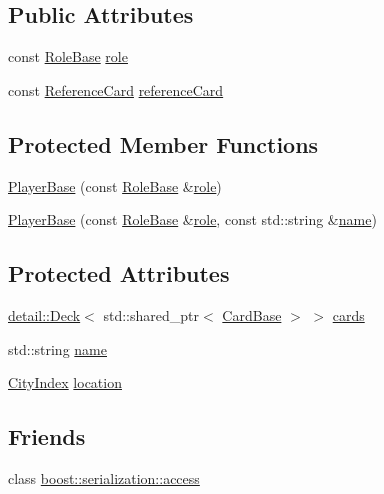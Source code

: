 \subsection*{Public Attributes}
\begin{DoxyCompactItemize}
\item 
const \hyperlink{classpan_1_1_role_base}{Role\+Base} \hyperlink{classpan_1_1_player_base_a63c1e92022a4eb34dc3a59d516ee6cea}{role}
\item 
const \hyperlink{classpan_1_1_reference_card}{Reference\+Card} \hyperlink{classpan_1_1_player_base_ae222fd3f8e044135bcc5d52fdd786804}{reference\+Card}
\end{DoxyCompactItemize}
\subsection*{Protected Member Functions}
\begin{DoxyCompactItemize}
\item 
\hyperlink{classpan_1_1_player_base_a3299b54cef6713e3d81313fd9a8f501d}{Player\+Base} (const \hyperlink{classpan_1_1_role_base}{Role\+Base} \&\hyperlink{classpan_1_1_player_base_a63c1e92022a4eb34dc3a59d516ee6cea}{role})
\item 
\hyperlink{classpan_1_1_player_base_af93832f2887f4e7c4242cb28ca881b1a}{Player\+Base} (const \hyperlink{classpan_1_1_role_base}{Role\+Base} \&\hyperlink{classpan_1_1_player_base_a63c1e92022a4eb34dc3a59d516ee6cea}{role}, const std\+::string \&\hyperlink{classpan_1_1_player_base_a95bf8887210003d8780dec9d84743a64}{name})
\end{DoxyCompactItemize}
\subsection*{Protected Attributes}
\begin{DoxyCompactItemize}
\item 
\hyperlink{classpan_1_1detail_1_1_deck}{detail\+::\+Deck}$<$ std\+::shared\+\_\+ptr$<$ \hyperlink{classpan_1_1_card_base}{Card\+Base} $>$ $>$ \hyperlink{classpan_1_1_player_base_a0f4e9109bf26267371442b2d5da75c49}{cards}
\item 
std\+::string \hyperlink{classpan_1_1_player_base_a95bf8887210003d8780dec9d84743a64}{name}
\item 
\hyperlink{namespacepan_afaed28aa6603153dcc062a028602d697}{City\+Index} \hyperlink{classpan_1_1_player_base_ad5b88869afb5740cf34f226fe36c5f27}{location}
\end{DoxyCompactItemize}
\subsection*{Friends}
\begin{DoxyCompactItemize}
\item 
class \hyperlink{classpan_1_1_player_base_ac98d07dd8f7b70e16ccb9a01abf56b9c}{boost\+::serialization\+::access}
\end{DoxyCompactItemize}


